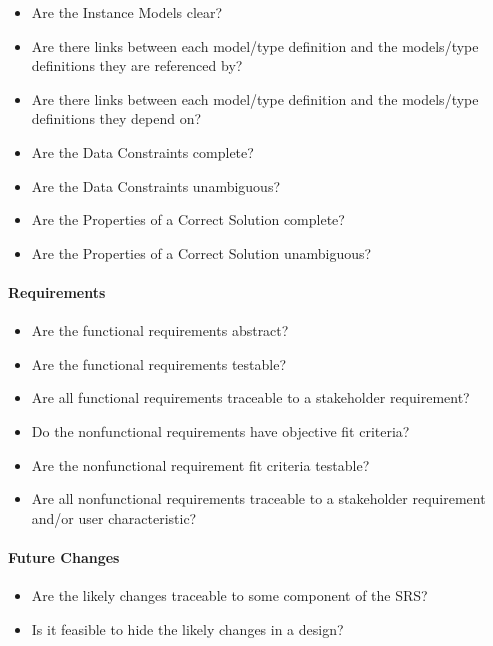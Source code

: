 \begin{itemize}
    \item Are the Instance Models clear?

    \item Are there links between each model/type definition and the
    models/type definitions they are referenced by?

    \item Are there links between each model/type definition and the
    models/type definitions they depend on?

    \item Are the Data Constraints complete?

    \item Are the Data Constraints unambiguous?

    \item Are the Properties of a Correct Solution complete?

    \item Are the Properties of a Correct Solution unambiguous?

\end{itemize}

\paragraph{Requirements}
\begin{itemize}

    \item Are the functional requirements abstract?

    \item Are the functional requirements testable?

    \item Are all functional requirements traceable to a stakeholder
    requirement?

    \item Do the nonfunctional requirements have objective fit criteria?

    \item Are the nonfunctional requirement fit criteria testable?

    \item Are all nonfunctional requirements traceable to a stakeholder
    requirement and/or user characteristic?

\end{itemize}

\paragraph{Future Changes}
\begin{itemize}

    \item Are the likely changes traceable to some component of the SRS?

    \item Is it feasible to hide the likely changes in a design?

\end{itemize}

